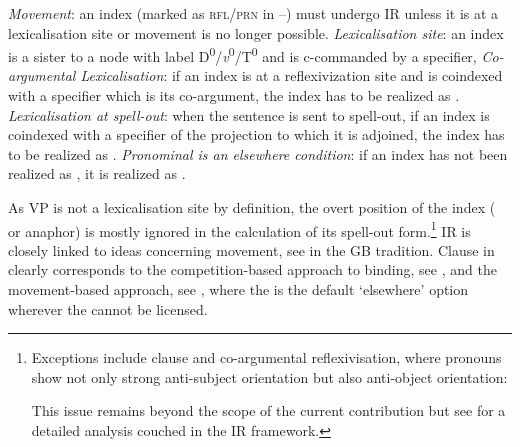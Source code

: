 \documentclass[output=paper,nonflat,colorlinks,citecolor=brown,newtxmath]{langsci/langscibook}
\begin{document}
\ea\label{ex:witkos:8}
\ea\label{ex:witkos:8a} \textit{Movement}: an index (marked as \textsc{rfl/prn} in --) must undergo IR unless it is at a lexicalisation site or movement is no longer possible.
\ex \label{ex:witkos:8b} \textit{Lexicalisation site}: an index is a sister to a node with label D\textsuperscript{0}/\textit{v}\textsuperscript{0}/T\textsuperscript{0} and is c-commanded by a specifier,
\ex \label{ex:witkos:8c} \textit{Co-argumental Lexicalisation}: if an index is at a reflexivization site and is coindexed with a specifier which is its co-argument, the index has to be realized as .
\ex \label{ex:witkos:8d} \textit{Lexicalisation at spell-out}: when the sentence is sent to spell-out, if an index is coindexed with a specifier of the projection to which it is adjoined, the index has to 	be realized as .
\ex \label{ex:witkos:8e} \textit{Pronominal is an elsewhere condition}: if an index has not been realized as , it is realized as .
\z\z

\largerpage
\noindent As VP is not a lexicalisation site by definition, the overt position of the index ( or anaphor) is mostly ignored in the calculation of its spell-out form.\footnote{\label{fn12}Exceptions include clause  and co-argumental reflexivisation, where pronouns show not only strong anti-subject orientation but also anti-object orientation:

\ea
{}
\z
\z

\noindent This issue remains beyond the scope of the current contribution but see \cite{goglozaetal_toappear} for a detailed analysis couched in the IR framework.} IR is closely linked to ideas concerning  movement, see \cite{sportiche1996,kayne1985,kayne1991,roberts1992,roberts1993} in the GB tradition. Clause in  clearly corresponds to the competition-based approach to binding, see \cite{safir2004}, and the movement-based approach, see \citep{hornstein2001,boeckxetal2008}, where the  is the default ‘elsewhere’ option wherever the  cannot be licensed.
\end{document}
